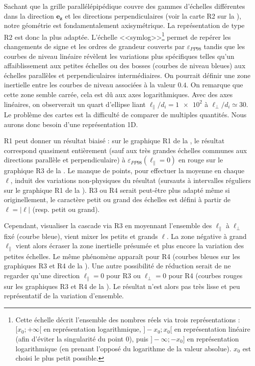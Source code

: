 Sachant que la grille parallélépipédique couvre des gammes d'échelles différentes dans la direction $\boldsymbol{e_z}$ et les directions perpendiculaires (voir la carte R2 sur la ), notre géométrie est fondamentalement axisymétrique. La représentation de type R2 est donc la plus adaptée. L'échelle <<symlog>>\footnote{Cette échelle décrit l'ensemble des nombres réels via trois représentations : $[x_0;+\infty[$ en représentation logarithmique, $]-x_0;x_0[$ en représentation linéaire (afin d'éviter la singularité du point 0), puis  $]-\infty; -x_0]$ en représentation logarithmique (en prenant l'opposé du logarithme de la valeur absolue). $x_0$ est choisi le plus petit possible.} permet de repérer les changements de signe et les ordres de grandeur couverts par $\varepsilon_{PP98}$ tandis que les courbes de niveau linéaire révèlent les variations plus spécifiques telles qu'un affaiblissement aux petites échelles ou des bosses (courbes de niveau bleues) aux échelles parallèles et perpendiculaires intermédiaires. On pourrait définir une zone inertielle entre les courbes de niveau associées à la valeur $\num{0.4}$. On remarque que cette zone semble carrée, cela est dû aux axes logarithmiques. Avec des axes linéaires, on observerait un quart d'ellipse liant $\ell_{\parallel}/d_i = \num{1e2}$ à $\ell_{\perp}/d_i \simeq \num{30} $. Le problème des cartes est la difficulté de comparer de multiples quantités. Nous aurons donc besoin d'une représentation \acs{1D}.

R1 peut donner un résultat biaisé : sur le graphique R1 de la , le résultat correspond quasiment entièrement (sauf aux très grandes échelles communes aux directions parallèle et perpendiculaire) à $\varepsilon_{PP98} (\ell_{\parallel} = 0)$ en rouge sur le graphique R3 de la . Le manque de points, pour effectuer la moyenne en chaque $\ell$, induit des variations non-physiques du résultat (sursauts à intervalles réguliers sur le graphique R1 de la ). R3 ou R4 serait peut-être plus adapté même si originellement, le caractère petit ou grand des échelles est défini à partir de $\ell=|\boldsymbol{\ell}|$ (resp. petit ou grand). 

Cependant, visualiser la cascade via R3 en moyennant l'ensemble des $\ell_{\parallel}$ à $\ell_{\perp}$ fixé (courbe bleue), vient mixer les petits et grands $\ell$. La zone négative à  grand $\ell_{\parallel}$ vient alors écraser la zone inertielle présumée et plus encore la variation des petites échelles. Le même phénomène apparaît pour R4 (courbes bleues sur les graphiques R3 et R4 de la ). Une autre possibilité de réduction serait de ne regarder qu'une direction $\ell_{\parallel} = 0$ pour R3 ou $\ell_{\perp} = 0$ pour R4 (courbes rouges sur les graphiques R3 et R4 de la ). Le résultat n'est alors pas très lisse et peu représentatif de la variation d'ensemble. 

